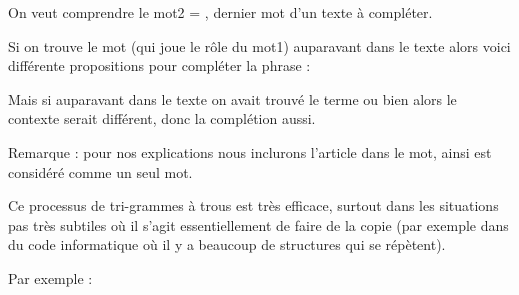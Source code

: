 \documentclass[11pt,class=report,crop=false]{standalone}
\begin{document}
\begin{exemple}
On veut comprendre le mot2 = , dernier mot d'un texte à compléter.

Si on trouve le mot  (qui joue le rôle du mot1) auparavant dans le texte alors voici différente propositions pour compléter la phrase :

Mais si auparavant dans le texte on avait trouvé le terme  ou bien  alors le contexte serait différent, donc la complétion aussi.



\end{exemple}

Remarque : pour nos explications nous inclurons l'article dans le mot, ainsi  est considéré comme un seul mot.

Ce processus de tri-grammes à trous est très efficace, surtout dans les situations pas très subtiles où il s'agit essentiellement de faire de la copie (par exemple dans du code informatique où il y a beaucoup de structures qui se répètent).

Par exemple :

\end{document}
